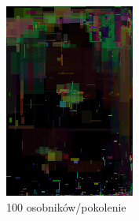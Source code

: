 \begin{figure}[!htb]
\begin{subfigure}[b]{0.3\textwidth}
         \includegraphics[width=\textwidth]{images/mona/10000_100_2/img_0_it_1000_best.png}
         \caption{100 osobników/pokolenie}
    \end{subfigure}
     \begin{subfigure}[b]{0.3\textwidth}
        \centering

\end{subfigure}
\end{figure}
